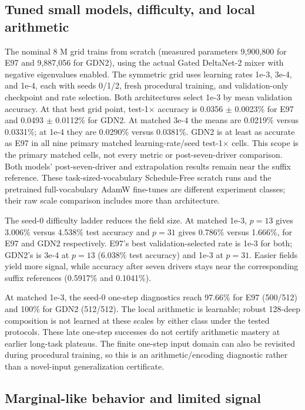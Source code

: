\documentclass[10pt]{article}
\theoremstyle{canonical}
\theoremstyle{canonicalbullet}
\begin{document}
\subsection*{Tuned small models, difficulty, and local arithmetic}


The nominal 8 M grid trains from scratch (measured parameters 9,900,800 for E97 and 9,887,056 for GDN2), using the actual Gated DeltaNet-2 mixer with negative eigenvalues enabled. The symmetric grid uses learning rates 1e-3, 3e-4, and 1e-4, each with seeds 0/1/2, fresh procedural training, and validation-only checkpoint and rate selection. Both architectures select 1e-3 by mean validation accuracy. At that best grid point, test-1\ensuremath{\times} accuracy is 0.0356 \ensuremath{\pm} 0.0023\% for E97 and 0.0493 \ensuremath{\pm} 0.0112\% for GDN2. At matched 3e-4 the means are 0.0219\% versus 0.0331\%; at 1e-4 they are 0.0290\% versus 0.0381\%. GDN2 is at least as accurate as E97 in all nine primary matched learning-rate/seed test-1\ensuremath{\times} cells. This scope is the primary matched cells, not every metric or post-seven-driver comparison. Both models' post-seven-driver and extrapolation results remain near the suffix reference. These task-sized-vocabulary Schedule-Free scratch runs and the pretrained full-vocabulary AdamW fine-tunes are different experiment classes; their raw scale comparison includes more than architecture.

The seed-0 difficulty ladder reduces the field size. At matched 1e-3, $p = 13$ gives 3.006\% versus 4.538\% test accuracy and $p = 31$ gives 0.786\% versus 1.666\%, for E97 and GDN2 respectively. E97's best validation-selected rate is 1e-3 for both; GDN2's is 3e-4 at $p = 13$ (6.038\% test accuracy) and 1e-3 at $p = 31$. Easier fields yield more signal, while accuracy after seven drivers stays near the corresponding suffix references (0.5917\% and 0.1041\%).

At matched 1e-3, the seed-0 one-step diagnostics reach 97.66\% for E97 (500/512) and 100\% for GDN2 (512/512). The local arithmetic is learnable; robust 128-deep composition is not learned at these scales by either class under the tested protocols. These late one-step successes do not certify arithmetic mastery at earlier long-task plateaus. The finite one-step input domain can also be revisited during procedural training, so this is an arithmetic/encoding diagnostic rather than a novel-input generalization certificate.


\subsection*{Marginal-like behavior and limited signal}
\end{document}
